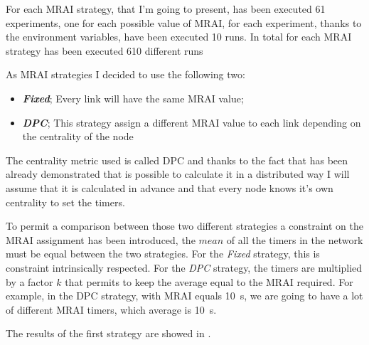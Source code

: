 For each \ac{MRAI} strategy, that I'm going to present, has been executed \num{61}
experiments, one for each possible value of \ac{MRAI}, for each experiment,
thanks to the environment variables, have been executed \num{10} runs.
In total for each \ac{MRAI} strategy has been executed \num{610} different runs

As \ac{MRAI} strategies I decided to use the following two:
\begin{itemize}
	\item \textbf{\textit{Fixed}}; Every link will have the same
		\ac{MRAI} value;
	\item \textbf{\textit{DPC}}; This strategy assign a different
		\ac{MRAI} value to each link depending on the centrality of the node \cite{milani2020improving}
\end{itemize}

The centrality metric used is called \ac{DPC} and thanks to the fact that has been
already demonstrated that is possible to calculate it in a distributed way \cite{milani2019BGP} I will
assume that it is calculated in advance and that every node knows it's own centrality to
set the timers.

To permit a comparison between those two different strategies a constraint on the
\ac{MRAI} assignment has been introduced, the $mean$ of all the timers in the network
must be equal between the two strategies.
For the \textit{Fixed} strategy, this is constraint intrinsically respected.
For the \textit{DPC} strategy, the timers are multiplied by a factor $k$ that
permits to keep the average equal to the \ac{MRAI} required.
For example, in the \ac{DPC} strategy, with \ac{MRAI} equals \SI{10}{\second},
we are going to have a lot of different \ac{MRAI} timers, which average is \SI{10}{\second}.

The results of the first strategy are showed in .

